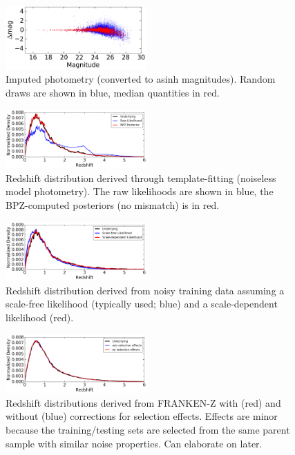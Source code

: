\documentclass[a4paper,fleqn,usenatbib,english]{mnras}
\begin{document}
\begin{figure}
\begin{center}
\includegraphics[width=0.48\textwidth]{mag_impute.png}
\end{center}
\caption{Imputed photometry (converted to asinh magnitudes). Random draws are shown in blue, median quantities in red.
}\label{fig:mag_impute}
\end{figure}

\begin{figure}
\begin{center}
\includegraphics[width=0.48\textwidth]{z_fits_model.png}
\end{center}
\caption{Redshift distribution derived through template-fitting (noiseless model photometry). The raw likelihoods are shown in blue, the BPZ-computed posteriors (no mismatch) is in red.
}\label{fig:bpz_fits}
\end{figure}

\begin{figure}
\begin{center}
\includegraphics[width=0.48\textwidth]{z_fits_model_sfixed.png}
\end{center}
\caption{Redshift distribution derived from noisy training data assuming a scale-free likelihood (typically used; blue) and a scale-dependent likelihood (red).
}\label{fig:ll_comp}
\end{figure}

\begin{figure}
\begin{center}
\includegraphics[width=0.48\textwidth]{z_fits_frankenz_sel.png}
\end{center}
\caption{Redshift distributions derived from FRANKEN-Z with (red) and without (blue) corrections for selection effects. Effects are minor because the training/testing sets are selected from the same parent sample with similar noise properties. Can elaborate on later.
}\label{fig:redshift_frankenz}
\end{figure}
\end{document}
